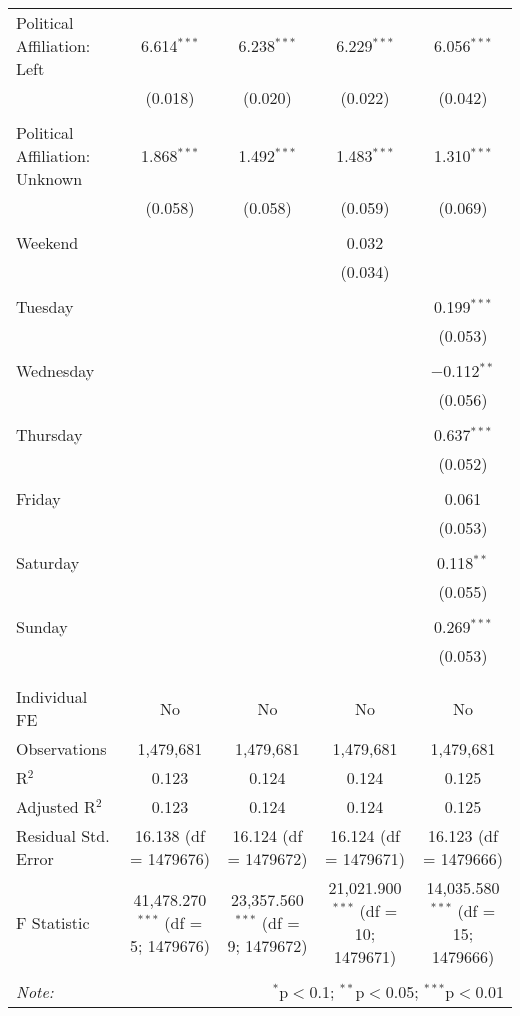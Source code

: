 \documentclass[
]{article}
\begin{document}
\begin{table}[!htbp]
{\begin{tabular}{@{\extracolsep{5pt}}lcccc}
 Political Affiliation: Left & 6.614$^{***}$ & 6.238$^{***}$ & 6.229$^{***}$ & 6.056$^{***}$ \\ 
  & (0.018) & (0.020) & (0.022) & (0.042) \\ 
  & & & & \\ 
 Political Affiliation: Unknown & 1.868$^{***}$ & 1.492$^{***}$ & 1.483$^{***}$ & 1.310$^{***}$ \\ 
  & (0.058) & (0.058) & (0.059) & (0.069) \\ 
  & & & & \\ 
 Weekend &  &  & 0.032 &  \\ 
  &  &  & (0.034) &  \\ 
  & & & & \\ 
 Tuesday &  &  &  & 0.199$^{***}$ \\ 
  &  &  &  & (0.053) \\ 
  & & & & \\ 
 Wednesday &  &  &  & $-$0.112$^{**}$ \\ 
  &  &  &  & (0.056) \\ 
  & & & & \\ 
 Thursday &  &  &  & 0.637$^{***}$ \\ 
  &  &  &  & (0.052) \\ 
  & & & & \\ 
 Friday &  &  &  & 0.061 \\ 
  &  &  &  & (0.053) \\ 
  & & & & \\ 
 Saturday &  &  &  & 0.118$^{**}$ \\ 
  &  &  &  & (0.055) \\ 
  & & & & \\ 
 Sunday &  &  &  & 0.269$^{***}$ \\ 
  &  &  &  & (0.053) \\ 
  & & & & \\ 
\hline \\[-1.8ex] 
Individual FE & No & No & No & No \\ 
Observations & 1,479,681 & 1,479,681 & 1,479,681 & 1,479,681 \\ 
R$^{2}$ & 0.123 & 0.124 & 0.124 & 0.125 \\ 
Adjusted R$^{2}$ & 0.123 & 0.124 & 0.124 & 0.125 \\ 
Residual Std. Error & 16.138 (df = 1479676) & 16.124 (df = 1479672) & 16.124 (df = 1479671) & 16.123 (df = 1479666) \\ 
F Statistic & 41,478.270$^{***}$ (df = 5; 1479676) & 23,357.560$^{***}$ (df = 9; 1479672) & 21,021.900$^{***}$ (df = 10; 1479671) & 14,035.580$^{***}$ (df = 15; 1479666) \\ 
\hline 
\hline \\[-1.8ex] 
\textit{Note:}  & \multicolumn{4}{r}{$^{*}$p$<$0.1; $^{**}$p$<$0.05; $^{***}$p$<$0.01} \\ 
\end{tabular}
} 
\end{table} 
\newpage
\end{document}
